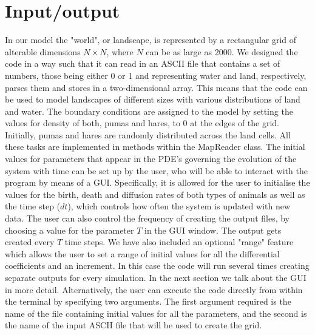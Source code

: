 \section{Input/output}
      
      In our model the "world", or landscape, is represented by a rectangular grid of alterable dimensions $N \times N$, where $N$ can be as large as 2000.
      We designed the code in a way such that it can read in an ASCII file that contains a set of numbers, those being either 0 or 1 and representing water and land, respectively, parses them and stores in a two-dimensional array. This means that the code can be used to model landscapes of different sizes with various distributions of land and water.
      \newline{}
      The boundary conditions are assigned to the model by setting the values for density of both, pumas and hares, to 0 at the edges of the grid.  Initially, pumas and hares are randomly distributed across the land cells. 
      All these tasks are implemented in methods within the MapReader class.
      \newline{}
      The initial values for parameters that appear in the PDE's governing the evolution of the system with time can be set up by the user, who will be able to interact with the program by means of a GUI. Specifically, it is allowed for the user to initialise the values for the birth, death and diffusion rates of both types of animals as well as the time step ($dt$), which controls how often the system is updated with new data.  The user can also control the frequency of creating the output files, by choosing a value for the parameter $T$ in the GUI window. The output gets created every $T$ time steps. We have also included an optional "range" feature which allows the user to set a range of initial values for all the differential coefficients and an increment. In this case the code will run several times creating separate outputs for every simulation. In the next section we talk about the GUI in more detail. 
      \newline{}
      Alternatively, the user can execute the code directly from within the terminal by specifying two arguments. The first argument required is the name of the file containing initial values for all the parameters, and the second is the name of the input ASCII file that will be used to create the grid. 
      \newline{}
      \newline{}
      
